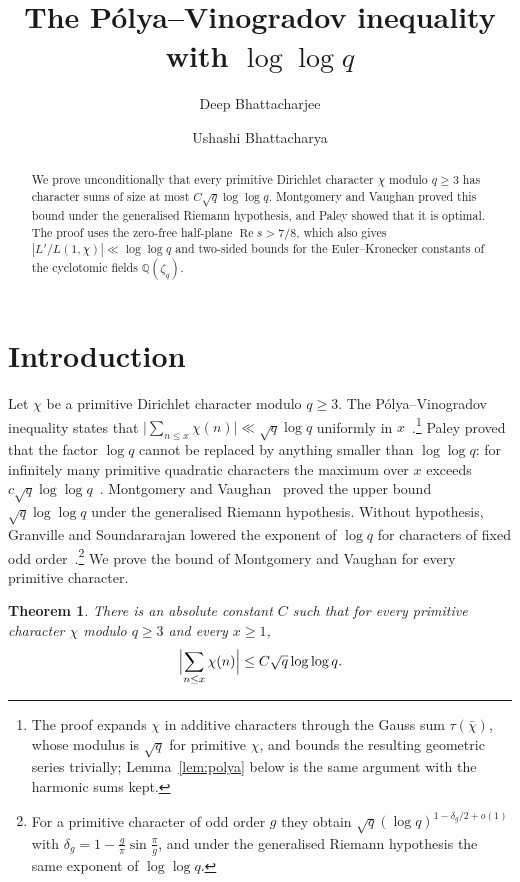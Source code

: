 \documentclass[12pt]{amsart}
\title[P\'olya--Vinogradov with $\log\log q$]{The P\'olya--Vinogradov inequality with $\log\log q$}
\author[D. Bhattacharjee]{Deep Bhattacharjee}
\author[U. Bhattacharya]{Ushashi Bhattacharya}
\date{}
\numberwithin{equation}{section}
\newtheorem{theorem}{Theorem}[section]
\theoremstyle{definition}
\renewcommand{\Re}{\operatorname{Re}}
\begin{document}
\begin{abstract}
We prove unconditionally that every primitive Dirichlet character $\chi$ modulo $q\ge3$ has
character sums of size at most $C\sqrt q\log\log q$. Montgomery and Vaughan proved this bound under
the generalised Riemann hypothesis, and Paley showed that it is optimal. The proof uses the
zero-free half-plane $\Re s>7/8$, which also gives $|L'/L(1,\chi)|\ll\log\log q$ and two-sided
bounds for the Euler--Kronecker constants of the cyclotomic fields $\mathbb Q(\zeta_q)$.
\end{abstract}

\maketitle

\section{Introduction}

Let $\chi$ be a primitive Dirichlet character modulo $q\ge3$. The P\'olya--Vinogradov inequality
states that $\bigl|\sum_{n\le x}\chi(n)\bigr|\ll\sqrt q\log q$ uniformly in
$x$~\cite[Chapter~23]{Dav00}.\footnote{The proof expands $\chi$ in additive characters through the
Gauss sum $\tau(\bar\chi)$, whose modulus is $\sqrt q$ for primitive $\chi$, and bounds the
resulting geometric series trivially; Lemma~\ref{lem:polya} below is the same argument with the
harmonic sums kept.} Paley proved that the factor $\log q$ cannot be replaced by anything smaller
than $\log\log q$: for infinitely many primitive quadratic characters the maximum over $x$ exceeds
$c\sqrt q\log\log q$~\cite{Pal32}. Montgomery and Vaughan~\cite{MV77} proved the upper bound
$\sqrt q\log\log q$ under the generalised Riemann hypothesis. Without hypothesis, Granville and
Soundararajan lowered the exponent of $\log q$ for characters of fixed odd
order~\cite{GS07}.\footnote{For a primitive character of odd order $g$ they obtain
$\sqrt q(\log q)^{1-\delta_g/2+o(1)}$ with $\delta_g=1-\frac g\pi\sin\frac\pi g$, and under the
generalised Riemann hypothesis the same exponent of $\log\log q$.} We prove the bound of Montgomery and Vaughan for every primitive character.

\begin{theorem}\label{thm:pv}
There is an absolute constant $C$ such that for every primitive character $\chi$ modulo $q\ge3$
and every $x\ge1$,
\[
  \Bigl|\sum_{n\le x}\chi(n)\Bigr|\le C\sqrt q\log\log q.
\]
\end{theorem}
\end{document}
